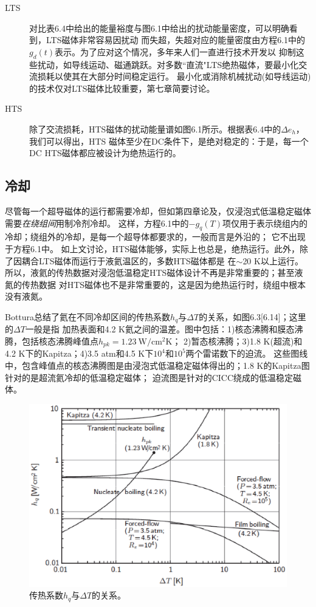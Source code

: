 \begin{description}
	\item[LTS] 对比表6.4中给出的能量裕度与图6.1中给出的扰动能量密度，可以明确看到，LTS磁体非常容易因扰动
	而失超，失超对应的能量密度由方程6.1中的$g_d(t)$表示。为了应对这个情况，多年来人们一直进行技术开发以
	抑制这些扰动，如导线运动、磁通跳跃。对多数``直流"LTS绝热磁体，要最小化交流损耗以使其在大部分时间稳定运行。
	最小化或消除机械扰动(如导线运动)的技术仅对LTS磁体比较重要，第七章简要讨论。
	\item[HTS] 除了交流损耗，HTS磁体的扰动能量谱如图6.1所示。根据表6.4中的$\Delta e_h$，我们可以得出，HTS
	磁体至少在DC条件下，是绝对稳定的：于是，每一个DC HTS磁体都应被设计为绝热运行的。
\end{description}

\subsection{冷却}
尽管每一个超导磁体的运行都需要冷却，但如第四章论及，仅浸泡式低温稳定磁体需要\emph{在绕组间}用制冷剂冷却。
这样，方程6.1中的$-g_q(T)$项仅用于表示绕组内的冷却；绕组外的冷却，是每一个超导体都要求的，一般而言是外沿的；
它不出现于方程6.1中。
如上文讨论，HTS磁体能够，实际上也总是，绝热运行。此外，除了因耦合LTS磁体而运行于液氦温区的，多数HTS磁体都是
在$\sim$20 K以上运行。所以，液氦的传热数据对浸泡低温稳定HTS磁体设计不再是非常重要的；甚至液氮的传热数据
对HTS磁体也不是非常重要的，这是因为绝热运行时，绕组中根本没有液氮。

Bottura总结了氦在不同冷却区间的传热系数$h_q$与$\Delta T$的关系，如图6.3[6.14]；这里的$\Delta T$一般是指
加热表面和4.2 K氦之间的温差。图中包括：1)核态沸腾和膜态沸腾，包括核态沸腾峰值点$h_{pk}=1.23\ \mathrm{W/cm^2 K}$；
2)暂态核沸腾；3)1.8 K(超流)和4.2 K下的Kapitza；4)3.5 atm和4.5 K下$10^4$和$10^5$两个雷诺数下的迫流。
这些图线中，包含峰值点的核态沸腾图是由浸泡式低温稳定磁体得出的；1.8 K的Kapitza图针对的是超流氦冷却的低温稳定磁体；
迫流图是针对的CICC绕成的低温稳定磁体。
\begin{figure}[htbp]
	\centering
	\includegraphics[scale=0.7]{chpt6/figs/fig6.3.eps}
	\caption{传热系数$h_q$与$\Delta T$的关系。}
\end{figure}


